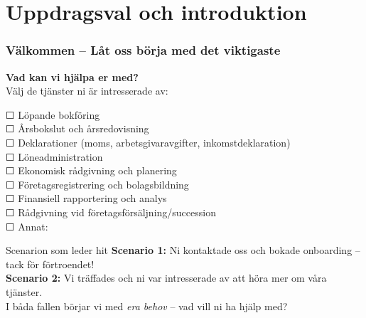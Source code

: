 \documentclass[10pt]{beamer}
\begin{document}
\section{Uppdragsval och introduktion}

\begin{frame}[label=intro]
  \frametitle{Välkommen – Låt oss börja med det viktigaste}

  \small
  
  \textbf{Vad kan vi hjälpa er med?}\\
  \vspace{0.3cm}
  Välj de tjänster ni är intresserade av:\\
  \vspace{0.2cm}
  
  ☐ Löpande bokföring\\
  ☐ Årsbokslut och årsredovisning\\
  ☐ Deklarationer (moms, arbetsgivaravgifter, inkomstdeklaration)\\
  ☐ Löneadministration\\
  ☐ Ekonomisk rådgivning och planering\\
  ☐ Företagsregistrering och bolagsbildning\\
  ☐ Finansiell rapportering och analys\\
  ☐ Rådgivning vid företagsförsäljning/succession\\
  ☐ Annat: \underline{\hspace{5cm}}
  
  \vspace{0.5cm}
  
  \begin{block}{Scenarion som leder hit}
    \footnotesize
    \textbf{Scenario 1:} Ni kontaktade oss och bokade onboarding – tack för förtroendet!\\
    \textbf{Scenario 2:} Vi träffades och ni var intresserade av att höra mer om våra tjänster.\\
    \vspace{0.2cm}
    I båda fallen börjar vi med \textit{era behov} – vad vill ni ha hjälp med?
  \end{block}
  

\end{frame}
\end{document}
